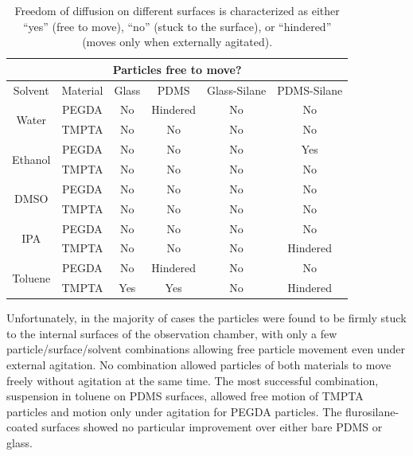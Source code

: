 \begin{table}[h]
\begin{center}

\begin{tabular}{| c | c | c | c | c | c |}

\hline

\multicolumn{6}{|c|}{Particles free to move?} \\ \hline
Solvent & Material & Glass & PDMS & Glass-Silane & PDMS-Silane \\ \hline

\multirow{2}{*}{Water} & PEGDA & No & Hindered & No & No \\
 & TMPTA & No & No & No & No \\ \hline

\multirow{2}{*}{Ethanol} & PEGDA & No & No & No & Yes \\
 & TMPTA & No & No & No & No \\ \hline

\multirow{2}{*}{DMSO} & PEGDA & No & No & No & No \\
 & TMPTA & No & No & No & No \\ \hline

\multirow{2}{*}{IPA} & PEGDA & No & No & No & No \\
 & TMPTA & No & No & No & Hindered \\ \hline

\multirow{2}{*}{Toluene} & PEGDA & No & Hindered & No & No \\
 & TMPTA & Yes & Yes & No & Hindered \\ \hline

\end{tabular}
\end{center}
\caption{Freedom of diffusion on different surfaces is characterized as either 
``yes'' (free to move), ``no'' (stuck to the surface), or ``hindered'' (moves only when externally agitated).}
\label{tab:surface-diff}
\end{table}

Unfortunately, in the majority of cases the particles were found to be firmly stuck to the
internal surfaces of the observation chamber, with only a few particle/surface/solvent combinations allowing 
free particle movement even under external agitation.  No combination allowed particles of both materials to move freely
without agitation at the same time. The most successful combination, suspension in toluene 
on PDMS surfaces, allowed free motion of TMPTA particles and motion only under agitation for PEGDA
particles.  The flurosilane-coated surfaces showed no particular improvement over 
either bare PDMS or glass.

